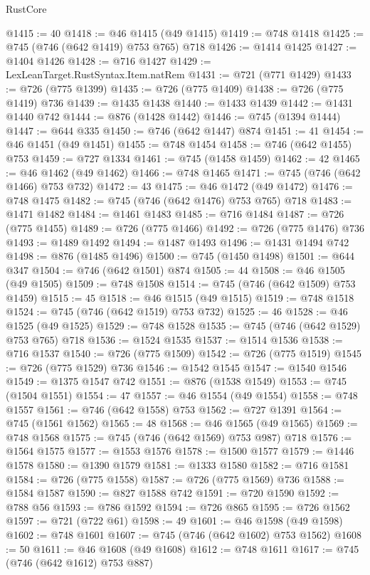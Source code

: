 \begin{lexlean}{RustCore}
\begin{coremodule}
@1415 := 40
@1418 := @46 @1415 (@49 @1415)
@1419 := @748 @1418
@1425 := @745 (@746 (@642 @1419) @753 @765) @718
@1426 := @1414 @1425
@1427 := @1404 @1426
@1428 := @716 @1427
@1429 := LexLeanTarget.RustSyntax.Item.natRem
@1431 := @721 (@771 @1429)
@1433 := @726 (@775 @1399)
@1435 := @726 (@775 @1409)
@1438 := @726 (@775 @1419) @736
@1439 := @1435 @1438
@1440 := @1433 @1439
@1442 := @1431 @1440 @742
@1444 := @876 (@1428 @1442)
@1446 := @745 (@1394 @1444)
@1447 := @644 @335
@1450 := @746 (@642 @1447) @874
@1451 := 41
@1454 := @46 @1451 (@49 @1451)
@1455 := @748 @1454
@1458 := @746 (@642 @1455) @753
@1459 := @727 @1334
@1461 := @745 (@1458 @1459)
@1462 := 42
@1465 := @46 @1462 (@49 @1462)
@1466 := @748 @1465
@1471 := @745 (@746 (@642 @1466) @753 @732)
@1472 := 43
@1475 := @46 @1472 (@49 @1472)
@1476 := @748 @1475
@1482 := @745 (@746 (@642 @1476) @753 @765) @718
@1483 := @1471 @1482
@1484 := @1461 @1483
@1485 := @716 @1484
@1487 := @726 (@775 @1455)
@1489 := @726 (@775 @1466)
@1492 := @726 (@775 @1476) @736
@1493 := @1489 @1492
@1494 := @1487 @1493
@1496 := @1431 @1494 @742
@1498 := @876 (@1485 @1496)
@1500 := @745 (@1450 @1498)
@1501 := @644 @347
@1504 := @746 (@642 @1501) @874
@1505 := 44
@1508 := @46 @1505 (@49 @1505)
@1509 := @748 @1508
@1514 := @745 (@746 (@642 @1509) @753 @1459)
@1515 := 45
@1518 := @46 @1515 (@49 @1515)
@1519 := @748 @1518
@1524 := @745 (@746 (@642 @1519) @753 @732)
@1525 := 46
@1528 := @46 @1525 (@49 @1525)
@1529 := @748 @1528
@1535 := @745 (@746 (@642 @1529) @753 @765) @718
@1536 := @1524 @1535
@1537 := @1514 @1536
@1538 := @716 @1537
@1540 := @726 (@775 @1509)
@1542 := @726 (@775 @1519)
@1545 := @726 (@775 @1529) @736
@1546 := @1542 @1545
@1547 := @1540 @1546
@1549 := @1375 @1547 @742
@1551 := @876 (@1538 @1549)
@1553 := @745 (@1504 @1551)
@1554 := 47
@1557 := @46 @1554 (@49 @1554)
@1558 := @748 @1557
@1561 := @746 (@642 @1558) @753
@1562 := @727 @1391
@1564 := @745 (@1561 @1562)
@1565 := 48
@1568 := @46 @1565 (@49 @1565)
@1569 := @748 @1568
@1575 := @745 (@746 (@642 @1569) @753 @987) @718
@1576 := @1564 @1575
@1577 := @1553 @1576
@1578 := @1500 @1577
@1579 := @1446 @1578
@1580 := @1390 @1579
@1581 := @1333 @1580
@1582 := @716 @1581
@1584 := @726 (@775 @1558)
@1587 := @726 (@775 @1569) @736
@1588 := @1584 @1587
@1590 := @827 @1588 @742
@1591 := @720 @1590
@1592 := @788 @56
@1593 := @786 @1592
@1594 := @726 @865
@1595 := @726 @1562
@1597 := @721 (@722 @61)
@1598 := 49
@1601 := @46 @1598 (@49 @1598)
@1602 := @748 @1601
@1607 := @745 (@746 (@642 @1602) @753 @1562)
@1608 := 50
@1611 := @46 @1608 (@49 @1608)
@1612 := @748 @1611
@1617 := @745 (@746 (@642 @1612) @753 @887)

\end{coremodule}
\end{lexlean}
